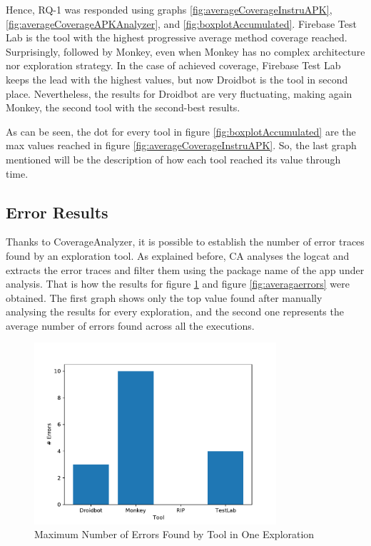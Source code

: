 Hence, RQ-1 was responded using graphs \ref{fig:averageCoverageInstruAPK}, \ref{fig:averageCoverageAPKAnalyzer}, and \ref{fig:boxplotAccumulated}. Firebase Test Lab is the tool with the highest progressive average method coverage reached. Surprisingly, followed by Monkey, even when Monkey has no complex architecture nor exploration strategy. In the case of achieved coverage, Firebase Test Lab keeps the lead with the highest values, but now Droidbot is the tool in second place. Nevertheless, the results for Droidbot are very fluctuating, making again Monkey, the second tool with the second-best results. 

As can be seen, the dot for every tool in figure \ref{fig:boxplotAccumulated} are the max values reached in figure \ref{fig:averageCoverageInstruAPK}. So, the last graph mentioned will be the description of how each tool reached its value through time.

\subsection{Error Results}\label{sec:errorResults}

Thanks to CoverageAnalyzer, it is possible to establish the number of error traces found by an exploration tool. As explained before, CA analyses the logcat and extracts the error traces and filter them using the package name of the app under analysis. That is how the results for 
figure \ref{fig:maxerrors} and figure \ref{fig:averagaerrors} were obtained. The first graph shows only the top value found after manually analysing the results for every exploration, and the second one represents the average number of errors found across all the executions.
 

\begin{figure}[h]
\centering
\includegraphics[width=0.8\textwidth]{../Figures/maxErrors.pdf}
\caption{Maximum Number of Errors Found by Tool in One Exploration}\label{fig:maxerrors}
\end{figure}

